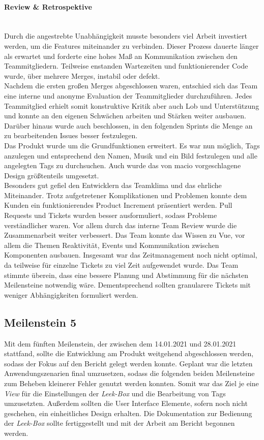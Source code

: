 \documentclass[10pt, a4paper]{article}
\begin{document}
\begin{onehalfspace}
\paragraph*{Review \& Retrospektive} $~$ \\
Durch die angestrebte Unabhängigkeit musste besonders viel Arbeit investiert werden, um die Features miteinander zu verbinden.
Dieser Prozess dauerte länger als erwartet und forderte eine hohes Maß an Kommunikation zwischen den Teammitgliedern.
Teilweise enstanden Wartezeiten und funktionierender Code wurde, über mehrere Merges, instabil oder defekt.\\
Nachdem die ersten großen Merges abgeschlossen waren, entschied sich das Team eine interne und anonyme Evaluation der Teammitglieder durchzuführen.
Jedes Teammitglied erhielt somit konstruktive Kritik aber auch Lob und Unterstützung und konnte an den eigenen Schwächen arbeiten und Stärken weiter ausbauen.
Darüber hinaus wurde auch beschlossen, in den folgenden Sprints die Menge an zu bearbeitenden Issues besser festzulegen.\\
Das Produkt wurde um die Grundfunktionen erweitert.
Es war nun möglich, Tags anzulegen und entsprechend den Namen, Musik und ein Bild festzulegen
  und alle angelegten Tags zu durchsuchen.
Auch wurde das von macio vorgeschlagene Design größtenteils umgesetzt.\\
Besonders gut gefiel den Entwicklern das Teamklima und das ehrliche Miteinander.
Trotz aufgetretener Komplikationen und Problemen konnte dem Kunden ein funktionierendes Product Increment präsentiert werden.
Pull Requests und Tickets wurden besser ausformuliert, sodass Probleme verständlicher waren.
Vor allem durch das interne Team Review wurde die Zusammenarbeit weiter verbessert.
Das Team konnte das Wissen zu Vue, vor allem die Themen Reaktivität, Events und Kommunikation zwischen Komponenten ausbauen.
Insgesamt war das Zeitmanagement noch nicht optimal, da teilweise für einzelne Tickets zu viel Zeit aufgewendet wurde.
Das Team stimmte überein, dass eine bessere Planung und Abstimmung für die nächsten Meilensteine notwendig wäre.
Dementsprechend sollten granularere Tickets mit weniger Abhängigkeiten formuliert werden.


\subsection{Meilenstein 5}
Mit dem fünften Meilenstein, der zwischen dem 14.01.2021 und 28.01.2021 stattfand, sollte die Entwicklung am Produkt weitgehend abgeschlossen werden, sodass der Fokus auf den Bericht gelegt werden konnte.
Geplant war die letzten Anwendungszenarien final umzusetzen, sodass die folgenden beiden Meilensteine zum Beheben kleinerer Fehler genutzt werden konnten.
Somit war das Ziel je eine \textit{View} für die Einstellungen der \textit{Leek-Box} und die Bearbeitung von Tags umzusetzten.
Außerdem sollten die User Interface Elemente, sofern noch nicht geschehen, ein einheitliches Design erhalten.
Die Dokumentation zur Bedienung der \textit{Leek-Box} sollte fertiggestellt und mit der Arbeit am Bericht begonnen werden.


\end{onehalfspace}
\end{document}

